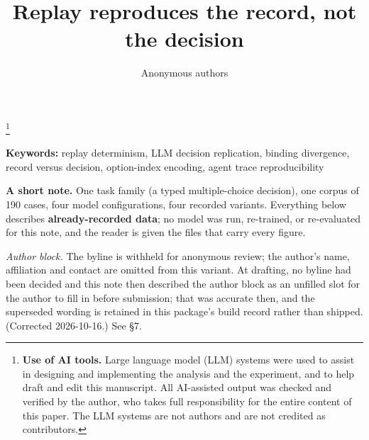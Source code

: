 \documentclass[10pt]{article}
\title{Replay reproduces the record, not the decision}
\author{Anonymous authors}
\date{}   %
\newcommand\blfootnote[1]{%
  \begingroup
  \renewcommand\thefootnote{}%
  \footnote{#1}%
  \addtocounter{footnote}{-1}%
  \endgroup}
\begin{document}
\maketitle

\blfootnote{\textbf{Use of AI tools.} Large language model (LLM) systems were used to assist in designing and implementing the analysis and the experiment, and to help draft and edit this manuscript. All AI-assisted output was checked and verified by the author, who takes full responsibility for the entire content of this paper. The LLM systems are not authors and are not credited as contributors.}
\noindent\textbf{Keywords:} replay determinism, LLM decision replication, binding divergence, record versus decision, option-index encoding, agent trace reproducibility

\textbf{A short note.} One task family (a typed multiple-choice decision), one corpus of 190 cases, four model configurations, four recorded variants. Everything below describes \textbf{already-recorded data}; no model was run, re-trained, or re-evaluated for this note, and the reader is given the files that carry every figure.

\emph{Author block.} The byline is withheld for anonymous review; the author's name, affiliation and contact are omitted from this variant. At drafting, no byline had been decided and this note then described the author block as an unfilled slot for the author to fill in before submission; that was accurate then, and the superseded wording is retained in this package's build record rather than shipped. (Corrected 2026-10-16.) See \S7.
\end{document}
